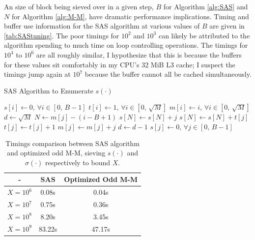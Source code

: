 \documentclass{article}
\theoremstyle{definition}
\begin{document}
An size of block being sieved over in a given step, $B$ for Algorithm \autoref{alg:SAS} and $N$ for Algorithm \autoref{alg:M-M}, have dramatic performance implications. Timing and buffer use information for the SAS algorithm at various values of $B$ are given in \autoref{tab:SAStuning}. The poor timings for $10^2$ and $10^3$ can likely be attributed to the algorithm spending to much time on loop controlling operations. The timings for $10^4$ to $10^6$ are all roughly similar, I hypothesize that this is because the buffers for these values sit comfortably in my CPU's 32 MiB L3 cache; I suspect the timings jump again at $10^7$ because the buffer cannot all be cached simultaneously.   
\begin{algorithm}[H]
\caption{SAS Algorithm to Enumerate $s(\cdot)$} 
\begin{algorithmic}[1]
     
    \State $s[i] \gets 0,\, \forall i \in [0,\, B - 1]$
    \State $t[i] \gets 1,\, \forall i \in [0,\, \sqrt{M}]$ 
    \State $m[i] \gets i,\, \forall i \in [0,\, \sqrt{M}]$ 
        \State $d \gets \sqrt{M}$ 
                    \State $N \gets m[j] - (i - B + 1)$ 
                    \State $s[N] \gets s[N] + j$
                        \State $s[N] \gets s[N] + t[j]$ 
                    \EndIf
                    \State $t[j] \gets t[j] + 1$
                    \State $m[j] \gets m[j] + j$
                \EndIf
            \EndFor
                \State $d \gets d - 1$
            \EndWhile
        \EndWhile
        \State $s[j] \gets 0,\, \forall j \in [0,\, B - 1]$ 
    \EndFor
    \EndProcedure
\end{algorithmic}
\label{alg:SAS}
\end{algorithm}

\begin{table}[H]
    \centering
    \begin{tabular}{| c | c | c |}
        \hline
        -   &   SAS    &   Optimized Odd M-M \\ 
        \hline
        $X = 10^6$  &   0.08s    &  0.04s  \\
        $X = 10^7$  &   0.75s    &  0.36s  \\
        $X = 10^8$  &   8.20s    &  3.45s  \\
        $X = 10^9$  &   83.22s    &  47.17s  \\
        \hline
    \end{tabular}
    \caption{Timings comparison between SAS algorithm and optimized odd M-M, sieving $s(\cdot)$ and $\sigma(\cdot)$ respectively to bound $X$.}
    \label{tab:SAStiming}
\end{table}
\end{document}
